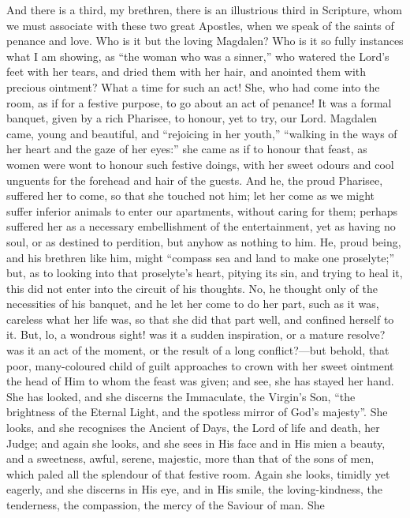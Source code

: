 And there is a third, my brethren, there is an illustrious third in
Scripture, whom we must associate with these two great Apostles, when
we speak of the saints of penance and love. Who is it but the loving
Magdalen? Who is it so fully instances what I am showing, as ``the
woman who was a sinner,'' who watered the Lord's feet with her
tears, and dried them with her hair, and anointed them with precious
ointment? What a time for such an act! She, who had come into the
room, as if for a festive purpose, to go about an act of penance! It
was a formal banquet, given by a rich Pharisee, to honour, yet to try,
our Lord. Magdalen came, young and beautiful, and ``rejoicing in
her youth,'' ``walking in the ways of her heart and the gaze
of her eyes:'' she came as if to honour that feast, as women were
wont to honour such festive doings, with her sweet odours and cool
unguents for the forehead and hair of the guests. And he, the proud
Pharisee, suffered her to come, so that she touched not him; let her
come as we might suffer inferior animals to enter our apartments,
without caring for them; perhaps suffered her as a necessary
embellishment of the entertainment, yet as having no soul, or as
destined to perdition, but anyhow as nothing to him. He, proud being,
and his brethren like him, might ``compass sea and land to make
one proselyte;'' but, as to looking into that proselyte's heart,
pitying its sin, and trying to heal it, this did not enter into the
circuit of his thoughts. No, he thought only of the necessities of his
banquet, and he let her come to do her part, such as it was, careless
what her life was, so that she did that part well, and confined
herself to it. But, lo, a wondrous sight! was it a sudden inspiration,
or a mature resolve? was it an act of the moment, or the result of a
long conflict?—but behold, that poor, many-coloured child of guilt
approaches to crown with her sweet ointment the head of Him to whom
the feast was given; and see, she has stayed her hand. She has looked,
and she discerns the Immaculate, the Virgin's Son, ``the
brightness of the Eternal Light, and the spotless mirror of God's
majesty''. She looks, and she recognises the Ancient of Days, the
Lord of life and death, her Judge; and again she looks, and she sees
in His face and in His mien a beauty, and a sweetness, awful, serene,
majestic, more than that of the sons of men, which paled all the
splendour of that festive room. Again she looks, timidly yet eagerly,
and she discerns in His eye, and in His smile, the loving-kindness,
the tenderness, the compassion, the mercy of the Saviour of man. She
